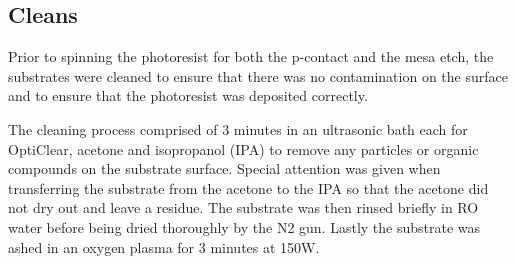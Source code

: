 \subsection{Cleans}
\label{sec:fab:cleans}

%

Prior to spinning the photoresist for both the p-contact and the mesa etch, the substrates were cleaned to ensure that there was no contamination on the surface and to ensure that the photoresist was deposited correctly.

The cleaning process comprised of 3 minutes in an ultrasonic bath each for OptiClear, acetone and isopropanol (IPA) to remove any particles or organic compounds on the substrate surface. Special attention was given when transferring the substrate from the acetone to the IPA so that the acetone did not dry out and leave a residue. The substrate was then rinsed briefly in RO water before being dried thoroughly by the N2 gun. Lastly the substrate was ashed in an oxygen plasma for 3 minutes at 150W.

